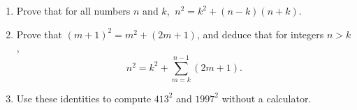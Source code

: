 \begin{enumerate}
\item[(a)] Prove that for all numbers $n$ and $k$, $\ n^2=k^2+(n-k)(n+k)$.
\item[(b)] Prove that $(m+1)^2=m^2+(2m+1)$, and deduce that for integers $n>k$,
\[n^2=k^2+\sum_{m=k}^{n-1}(2m+1).\]
\item[(c)] Use these identities to compute $413^2$ and $1997^2$ without a calculator.
\end{enumerate}
